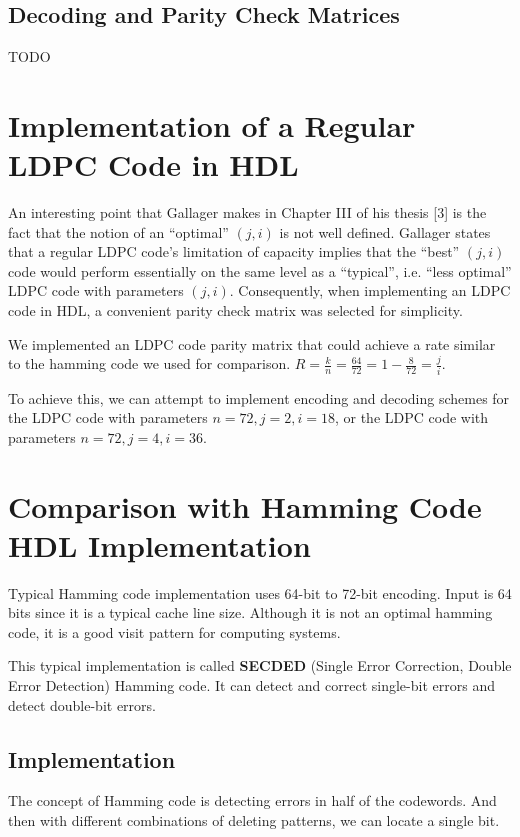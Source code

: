 \documentclass[conference]{IEEEtran}
\begin{document}
\subsection{Decoding and Parity Check Matrices}
TODO

\section{Implementation of a Regular LDPC Code in HDL}
An interesting point that Gallager makes in Chapter III of his thesis [3] is the fact that the notion of an ``optimal'' $(j,i)$ is not well defined.
Gallager states that a regular LDPC code's limitation of capacity implies that the ``best'' $(j,i)$ code would perform essentially on the same level as a ``typical'', i.e. ``less optimal'' LDPC code with parameters $(j,i)$.
Consequently, when implementing an LDPC code in HDL, a convenient parity check matrix was selected for simplicity.

We implemented an LDPC code parity matrix that could achieve a rate similar to
the hamming code we used for comparison.
$R=\frac{k}{n}=\frac{64}{72}=1-\frac{8}{72} = \frac{j}{i}$.

To achieve this, we can attempt to implement encoding and decoding schemes for
the LDPC code with parameters $n=72, j=2, i=18$, or the LDPC code with
parameters $n=72, j=4, i=36$.

\section{Comparison with Hamming Code HDL Implementation}
Typical Hamming code implementation uses 64-bit to 72-bit encoding. Input is 64
bits since it is a typical cache line size. Although it is not an optimal
hamming code, it is a good visit pattern for computing systems.

This typical implementation is called \textbf{SECDED} (Single Error Correction,
Double Error Detection) Hamming code. It can detect and correct single-bit
errors and detect double-bit errors.
\subsection{Implementation}
The concept of Hamming code is detecting errors in half of the codewords. And
then with different combinations of deleting patterns, we can locate a single
bit.
\end{document}
